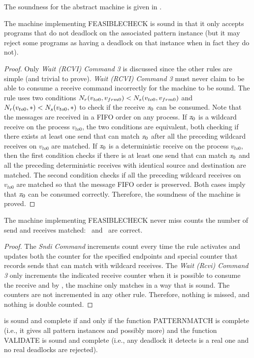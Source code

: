 The soundness for the abstract machine is given in .

\begin{lemma}
  The machine implementing \textrm{FEASIBLECHECK} is sound in that it
  only accepts programs that do not deadlock on the associated pattern
  instance (but it may reject some programs as having a deadlock on
  that instance when in fact they do not).
\label{lemma:sound}
\end{lemma}
\begin{proof}
  Only \emph{Wait (RCVI) Command 3} is discussed since the
  other rules are simple (and trivial to prove). \emph{Wait (RCVI) Command 3} must never
  claim to be able to consume a receive command incorrectly for
  the machine to be sound. The rule uses two conditions 
  $\textit{$N_r$}(v_{to0},v_{frm0}) < \textit{$N_s$}(v_{to0},v_{frm0})$
and 
$\textit{$N_r$}(v_{to0},\ast) < \textit{$N_s$}(v_{to0},\ast)$
to check if the receive $\mathit{x}_0$ can be consumed. Note that the messages are received in a FIFO order on any process. If $\mathit{x}_0$ is a wildcard receive on the process $v_{to0}$, the two conditions are equivalent, both checking if there exists at least one send that can match $\mathit{x}_0$ after all the preceding wildcard receives on $v_{to0}$ are matched. 
If $\mathit{x}_0$ is a deterministic receive on the process $v_{to0}$, then the first condition checks if there is at least one send that can match $\mathit{x}_0$ and all the preceding deterministic receives with identical source and destination are matched. The second condition checks if all the preceding wildcard receives on $v_{to0}$ are matched so that the message FIFO order is preserved. Both cases imply that $\mathit{x}_0$ can be consumed correctly. Therefore, the soundness of the machine is proved.  
\end{proof}

\begin{cor}
  The machine implementing \textrm{FEASIBLECHECK} never miss counts the number of send and receives matched: \eprcv\ and \epsnd\ are correct.
\end{cor}
\label{cor:count}
\begin{proof}
  The \emph{Sndi Command} increments count every time the rule activates and updates both the counter for the specified endpoints and special counter that records sends that can match with wildcard receives. The \emph{Wait (Rcvi) Command 3} only increments the indicated receive counter when it is possible to consume the receive and by , the machine only matches in a way that is sound. The counters are not incremented in any other rule. Therefore, nothing is missed, and nothing is double counted.
\end{proof}
\begin{cor}
   is sound and complete if and only if the function \textrm{PATTERNMATCH} is complete (i.e., it gives all pattern instances and possibly more) and the function \textrm{VALIDATE} is sound and complete (i.e., any deadlock it detects is a real one and no real deadlocks are rejected).
\end{cor}
  
